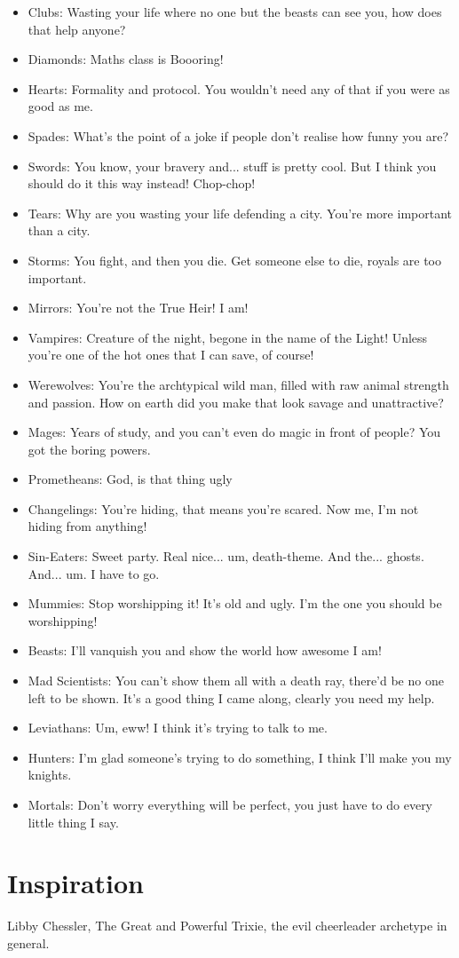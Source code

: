 \begin{itemize}
\item Clubs: Wasting your life where no one but the beasts can see you, how does that help anyone?
\item Diamonds: Maths class is Boooring!
\item Hearts: Formality and protocol. You wouldn't need any of that if you were as good as me.
\item Spades: What's the point of a joke if people don't realise how funny you are?
\item Swords: You know, your bravery and... stuff is pretty cool. But I think you should do it this way instead! Chop-chop!
\item Tears: Why are you wasting your life defending a city. You're more important than a city.
\item Storms: You fight, and then you die. Get someone else to die, royals are too important.
\item Mirrors: You're not the True Heir! I am!

\item Vampires: Creature of the night, begone in the name of the Light! Unless you're one of the hot ones that I can save, of course!
\item Werewolves: You're the archtypical wild man, filled with raw animal strength and passion. How on earth did you make that look savage and unattractive?
\item Mages: Years of study, and you can't even do magic in front of people? You got the boring powers.
\item Prometheans: God, is that thing ugly
\item Changelings: You're hiding, that means you're scared. Now me, I'm not hiding from anything!
\item Sin-Eaters: Sweet party. Real nice... um, death-theme. And the... ghosts. And... um. I have to go.
\item Mummies: Stop worshipping it! It's old and ugly. I'm the one you should be worshipping!
\item Beasts: I'll vanquish you and show the world how awesome I am!
\item Mad Scientists: You can't show them all with a death ray, there'd be no one left to be shown. It's a good thing I came along, clearly you need my help.
\item Leviathans: Um, eww! I think it's trying to talk to me.
\item Hunters: I'm glad someone's trying to do something, I think I'll make you my knights.
\item Mortals: Don't worry everything will be perfect, you just have to do every little thing I say.
\end{itemize}

\section*{Inspiration}

Libby Chessler, The Great and Powerful Trixie, the evil cheerleader archetype in general. 




